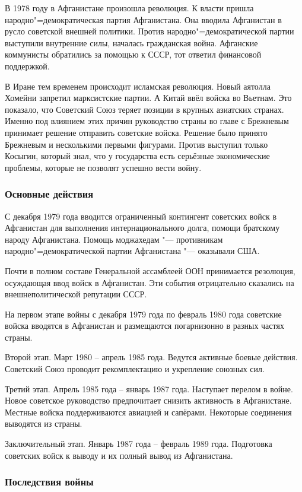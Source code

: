     В 1978 году в Афганистане произошла революция. К власти пришла народно"=демократическая партия Афганистана. Она вводила Афганистан в русло советской внешней политики. Против народно"=демократической партии выступили внутренние силы, началась гражданская война. Афганские коммунисты обратились за помощью к СССР, тот ответил финансовой поддержкой.
    
    В Иране тем временем происходит исламская революция. Новый аятолла Хомейни запретил марксистские партии. А Китай ввёл войска во Вьетнам. Это показало, что Советский Союз теряет позиции в крупных азиатских странах. Именно под влиянием этих причин руководство страны во главе с Брежневым принимает решение отправить советские войска. Решение было принято Брежневым и несколькими первыми фигурами. Против выступил только Косыгин, который знал, что у государства есть серьёзные экономические проблемы, которые не позволят успешно вести войну.

    \subsubsection{Основные действия}
    С декабря 1979 года вводится ограниченный контингент советских войск в Афганистан для выполнения интернационального долга, помощи братскому народу Афганистана. Помощь моджахедам "--- противникам народно"=демократической партии Афганистана "--- оказывали США.
    
    Почти в полном составе Генеральной ассамблеей ООН принимается резолюция, осуждающая ввод войск в Афганистан. Эти события отрицательно сказались на внешнеполитической репутации СССР.
    
    На первом этапе войны с декабря 1979 года по февраль 1980 года советские войска вводятся в Афганистан и размещаются погарнизонно в разных частях страны.
    
    Второй этап. Март 1980 -- апрель 1985 года. Ведутся активные боевые действия. Советский Союз проводит рекомплектацию и укрепление союзных сил.
    
    Третий этап. Апрель 1985 года -- январь 1987 года. Наступает перелом в войне. Новое советское руководство предпочитает снизить активность в Афганистане. Местные войска поддерживаются авиацией и сапёрами. Некоторые соединения выводятся из страны.
    
    Заключительный этап. Январь 1987 года -- февраль 1989 года. Подготовка советских войск к выводу и их полный вывод из Афганистана.

    \subsubsection{Последствия войны}
    
